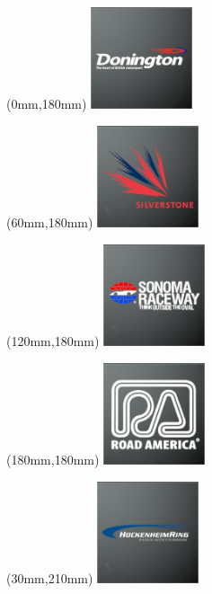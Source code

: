 \begin{textblock*}{30mm}(0mm,180mm)%
\includegraphics[width=30mm]{LG/2015-05-20_00080.png}
\end{textblock*}
\begin{textblock*}{30mm}(60mm,180mm)%
\includegraphics[width=30mm]{LG/2015-05-20_00094.png}
\end{textblock*}
\begin{textblock*}{30mm}(120mm,180mm)%
\includegraphics[width=30mm]{LG/2015-05-20_00096.png}
\end{textblock*}
\begin{textblock*}{30mm}(180mm,180mm)%
\includegraphics[width=30mm]{LG/2015-05-20_00092.png}
\end{textblock*}
\begin{textblock*}{30mm}(30mm,210mm)%
\includegraphics[width=30mm]{LG/2015-05-20_00082.png}
\end{textblock*}
